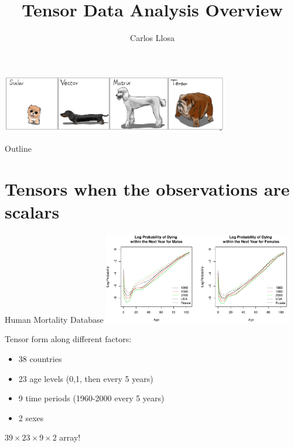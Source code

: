 \documentclass{beamer}
\title[]{Tensor Data Analysis Overview}
\author{Carlos Llosa}
\institute{STAT 680 lecture \\ November 08,2021 }
\date{}
\begin{document}
\begin{frame}
  \titlepage
  \centering
  \includegraphics[height = 2.5cm]{figures/tensordogs.png}
\end{frame}

\begin{frame}{Outline}
  \tableofcontents
\end{frame}























\section{Tensors when the observations are scalars}

\begin{frame}{Human Mortality Database }
  \centering
  \includegraphics[height = 4cm]{figures/human-mortality.png}

Tensor form along different factors:
\begin{itemize}
\item 38 countries
\item 23 age levels (0,1, then every 5 years)
\item 9 time periods (1960-2000 every 5 years)
\item 2 sexes
\end{itemize}
$39\times 23\times 9\times 2$ array!
\end{frame}
\end{document}
